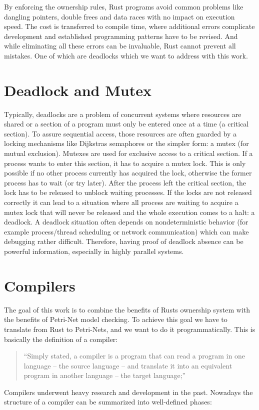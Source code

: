 By enforcing the ownership rules, Rust programs avoid common problems like dangling pointers, double frees and data races\cite{Matsakis:2014:RL:2692956.2663188} with no impact on execution speed.
The cost is transferred to compile time, where additional errors complicate development and established programming patterns have to be revised.
And while eliminating all these errors can be invaluable, Rust cannot prevent all mistakes.
One of which are deadlocks\cite[Chapter 8.1]{nomicon} which we want to address with this work.

\section{Deadlock and Mutex}
Typically, deadlocks are a problem of concurrent systems where resources are shared or a section of a program must only be entered once at a time (a critical section).
To assure sequential access, those resources are often guarded by a locking mechanisms like Dijkstras semaphores\cite{dijkstra1968cooperating} or the simpler form: a mutex (for mutual exclusion). Mutexes are used for exclusive access to a critical section.
If a process wants to enter this section, it has to acquire a mutex lock.
This is only possible if no other process currently has acquired the lock, otherwise the former process has to wait (or try later).
After the process left the critical section, the lock has to be released to unblock waiting processes.
If the locks are not released correctly it can lead to a situation where all process are waiting to acquire a mutex lock that will never be released and the whole execution comes to a halt: a deadlock.
A deadlock situation often depends on nondeterministic behavior (for example process/thread scheduling or network communication) which can make debugging rather difficult.
Therefore, having proof of deadlock absence can be powerful information, especially in highly parallel systems.

\section{Compilers}
The goal of this work is to combine the benefits of Rusts ownership system with the benefits of Petri-Net model checking.
To achieve this goal we have to translate from Rust to Petri-Nets, 
and we want to do it programmatically.
This is basically the definition of a compiler\cite[Chapter 1.1]{aho1986compilers}:
\begin{quote}
``Simply stated, a compiler is a program that can read a program in one language -- the source language -- and translate it into an equivalent program in another language -- the target language;''
\end{quote}
Compilers underwent heavy research and development in the past.
Nowadays the structure of a compiler can be summarized into well-defined phases\cite[Chapter 1.2]{aho1986compilers}:

